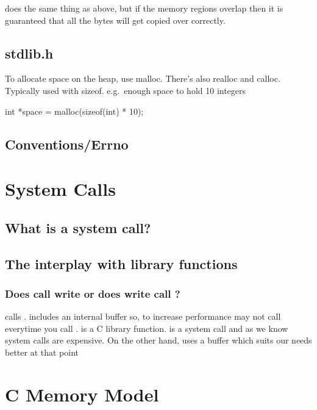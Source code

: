 does the same thing as above, but if the memory regions overlap then it
is guaranteed that all the bytes will get copied over correctly.

\subsection{stdlib.h}

To allocate space on the heap, use malloc. There's also realloc and calloc. Typically used with sizeof. e.g.~enough space to hold 10 integers

\begin{code}[language=C]
int *space = malloc(sizeof(int) * 10);
\end{code}

\subsection{Conventions/Errno}

\section{System Calls}

\subsection{What is a system call?}

\subsection{The interplay with library functions}

\subsubsection{Does  call write or does write call ?}

 calls .  includes an
internal buffer so, to increase performance  may not call
 everytime you call .  is a
C library function.  is a system call and as we know
system calls are expensive. On the other hand,  uses a
buffer which suits our needs better at that point

\section{C Memory Model}

